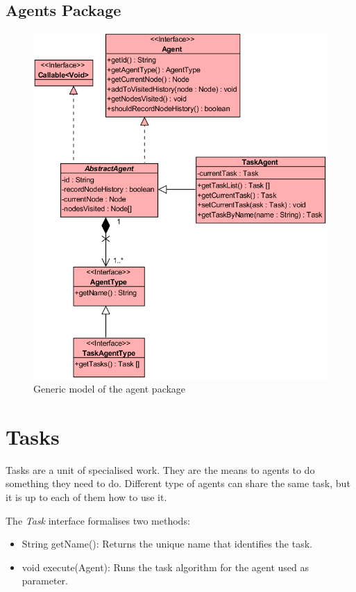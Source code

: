 \subsection{Agents Package}

\begin{figure}[H]
  \centering
  \includegraphics[width=0.9\linewidth]{gfx/uml-agent-package.png}
  \caption{Generic model of the agent package}
  \label{fig:gen-agent-package}
\end{figure}


\section {Tasks}

Tasks are a unit of specialised work. They are the means to agents to do something they need to do. Different type of agents can share the same task, but it is up to each of them how to use it.

The \emph{Task} interface formalises two methods:

\begin{itemize}
  \item String getName(): Returns the unique name that identifies the task.
  
  \item void execute(Agent): Runs the task algorithm for the agent used as parameter.
\end{itemize}


